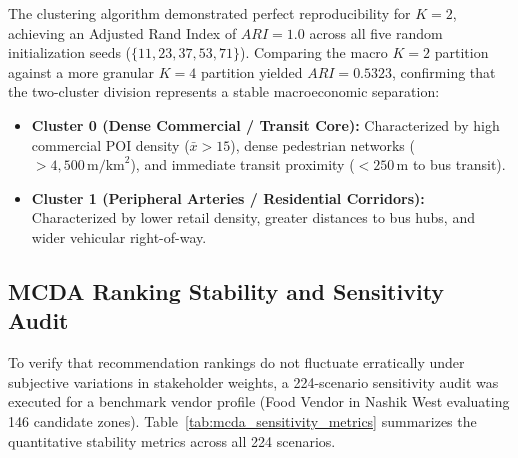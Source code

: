 The clustering algorithm demonstrated perfect reproducibility for $K=2$, achieving an Adjusted Rand Index of $ARI = 1.0$ across all five random initialization seeds ($\{11, 23, 37, 53, 71\}$). Comparing the macro $K=2$ partition against a more granular $K=4$ partition yielded $ARI = 0.5323$, confirming that the two-cluster division represents a stable macroeconomic separation:
\begin{itemize}
    \item \textbf{Cluster 0 (Dense Commercial / Transit Core):} Characterized by high commercial POI density ($\bar{x} > 15$), dense pedestrian networks ($> 4,500\,\text{m/km}^2$), and immediate transit proximity ($< 250\,\text{m}$ to bus transit).
    \item \textbf{Cluster 1 (Peripheral Arteries / Residential Corridors):} Characterized by lower retail density, greater distances to bus hubs, and wider vehicular right-of-way.
\end{itemize}

\subsection{MCDA Ranking Stability and Sensitivity Audit}
To verify that recommendation rankings do not fluctuate erratically under subjective variations in stakeholder weights, a 224-scenario sensitivity audit was executed for a benchmark vendor profile (Food Vendor in Nashik West evaluating 146 candidate zones). Table~\ref{tab:mcda_sensitivity_metrics} summarizes the quantitative stability metrics across all 224 scenarios.

